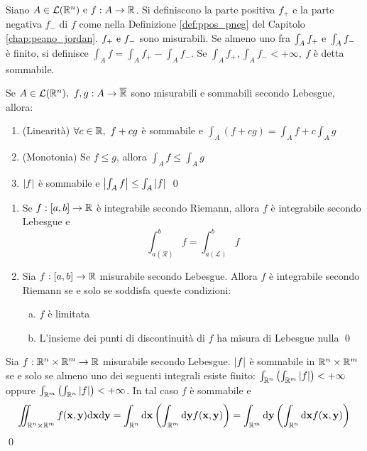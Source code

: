 \begin{definition}
	Siano $A\in\mathcal{L}(\mathbb{R}^n) \text{ e } f:A\to\mathbb{R}$. Si definiscono la parte positiva $f_+$ e la parte negativa $f_-$ di $f$ come nella Definizione \ref{def:ppos_pneg} del Capitolo \ref{chap:peano_jordan}. $f_+ \text{ e } f_-$ sono misurabili. Se almeno uno fra $\int_A f_+ \text{ e } \int_A f_-$ è finito, si definisce $\int_A f= \int_A f_+ - \int_A f_-$. Se $\int_A f_+,\int_A f_- <+\infty, \ f$ è detta sommabile.
\end{definition}

\begin{theorem}
	Se $A \in \mathcal{L}(\mathbb{R}^n), \ f,g:A \to \overline{\mathbb{R}}$ sono misurabili e sommabili secondo Lebesgue, allora:
	\begin{enumerate}
		\item (Linearità) $\forall c \in \R, \ f+cg$ è sommabile e $\int_A(f+cg)=\int_Af+c\int_Ag$
		\item (Monotonia) Se $f\leq g$, allora $\int_Af\leq\int_Ag$
		\item $\abs{f}$ è sommabile e $\abs{\int_Af}\leq\int_A\abs{f}$
		\qed
	\end{enumerate}
\end{theorem}

\begin{theorem}\leavevmode
	\begin{enumerate}
		\item Se $f:[a,b]\to\mathbb{R}$ è integrabile secondo Riemann, allora $f$ è integrabile secondo Lebesgue e $$\int_{a(\mathcal{R})}^bf=\int_{a(\mathcal{L})}^{b}f$$
		\item Sia $f:[a,b]\to\mathbb{R}$ misurabile secondo Lebesgue. Allora $f$ è integrabile secondo Riemann se e solo se soddisfa queste condizioni:
		\begin{enumerate}[a.]
			\item $f$ è limitata
			\item L'insieme dei punti di discontinuità di $f$ ha misura di Lebesgue nulla
			\qed
		\end{enumerate}
	\end{enumerate}
\end{theorem}

\begin{theorem}
	[di Fubini]
	Sia $f:\mathbb{R}^n\times\mathbb{R}^m\to\mathbb{R}$ misurabile secondo Lebesgue. $\abs{f}$ è sommabile in $\mathbb{R}^n\times\mathbb{R}^m$ se e solo se almeno uno dei seguenti integrali esiste finito: $\int_{\mathbb{R}^n}\left(\int_{\mathbb{R}^m}\abs{f}\right)<+\infty$ oppure $\int_{\mathbb{R}^m}\left(\int_{\mathbb{R}^n}\abs{f}\right)<+\infty$. In tal caso $f$ è sommabile e 
	$$
		\iint_{\mathbb{R}^n\times\mathbb{R}^m}f(\vb{x},\vb{y})\dd \vb{x} \dd \vb{y} = \int_{\mathbb{R}^n}\dd \vb{x}\left(\int_{\mathbb{R}^m} \dd \vb{y} f(\vb{x},\vb{y})\right)=\int_{\mathbb{R}^m}\dd \vb{y} \left(\int_{\mathbb{R}^n}\dd \vb{x} f(\vb{x},\vb{y})\right)
	$$
	\qed
\end{theorem}

